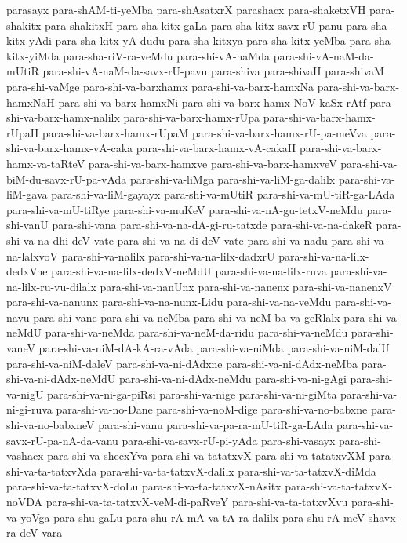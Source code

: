 {parasayx
para-shAM-ti-yeMba
para-shAsatxrX
parashacx
para-shaketxVH
para-shakitx
para-shakitxH
para-sha-kitx-gaLa
para-sha-kitx-savx-rU-panu
para-sha-kitx-yAdi
para-sha-kitx-yA-dudu
para-sha-kitxya
para-sha-kitx-yeMba
para-sha-kitx-yiMda
para-sha-riV-ra-veMdu
para-shi-vA-naMda
para-shi-vA-naM-da-mUtiR
para-shi-vA-naM-da-savx-rU-pavu
para-shiva
para-shivaH
para-shivaM
para-shi-vaMge
para-shi-va-barxhamx
para-shi-va-barx-hamxNa
para-shi-va-barx-hamxNaH
para-shi-va-barx-hamxNi
para-shi-va-barx-hamx-NoV-kaSx-rAtf
para-shi-va-barx-hamx-nalilx
para-shi-va-barx-hamx-rUpa
para-shi-va-barx-hamx-rUpaH
para-shi-va-barx-hamx-rUpaM
para-shi-va-barx-hamx-rU-pa-meVva
para-shi-va-barx-hamx-vA-caka
para-shi-va-barx-hamx-vA-cakaH
para-shi-va-barx-hamx-va-taRteV
para-shi-va-barx-hamxve
para-shi-va-barx-hamxveV
para-shi-va-biM-du-savx-rU-pa-vAda
para-shi-va-liMga
para-shi-va-liM-ga-dalilx
para-shi-va-liM-gava
para-shi-va-liM-gayayx
para-shi-va-mUtiR
para-shi-va-mU-tiR-ga-LAda
para-shi-va-mU-tiRye
para-shi-va-muKeV
para-shi-va-nA-gu-tetxV-neMdu
para-shi-vanU
para-shi-vana
para-shi-va-na-dA-gi-ru-tatxde
para-shi-va-na-dakeR
para-shi-va-na-dhi-deV-vate
para-shi-va-na-di-deV-vate
para-shi-va-nadu
para-shi-va-na-lalxvoV
para-shi-va-nalilx
para-shi-va-na-lilx-dadxrU
para-shi-va-na-lilx-dedxVne
para-shi-va-na-lilx-dedxV-neMdU
para-shi-va-na-lilx-ruva
para-shi-va-na-lilx-ru-vu-dilalx
para-shi-va-nanUnx
para-shi-va-nanenx
para-shi-va-nanenxV
para-shi-va-nanunx
para-shi-va-na-nunx-Lidu
para-shi-va-na-veMdu
para-shi-va-navu
para-shi-vane
para-shi-va-neMba
para-shi-va-neM-ba-va-geRlalx
para-shi-va-neMdU
para-shi-va-neMda
para-shi-va-neM-da-ridu
para-shi-va-neMdu
para-shi-vaneV
para-shi-va-niM-dA-kA-ra-vAda
para-shi-va-niMda
para-shi-va-niM-dalU
para-shi-va-niM-daleV
para-shi-va-ni-dAdxne
para-shi-va-ni-dAdx-neMba
para-shi-va-ni-dAdx-neMdU
para-shi-va-ni-dAdx-neMdu
para-shi-va-ni-gAgi
para-shi-va-nigU
para-shi-va-ni-ga-piRsi
para-shi-va-nige
para-shi-va-ni-giMta
para-shi-va-ni-gi-ruva
para-shi-va-no-Dane
para-shi-va-noM-dige
para-shi-va-no-babxne
para-shi-va-no-babxneV
para-shi-vanu
para-shi-va-pa-ra-mU-tiR-ga-LAda
para-shi-va-savx-rU-pa-nA-da-vanu
para-shi-va-savx-rU-pi-yAda
para-shi-vasayx
para-shi-vashacx
para-shi-va-shecxYva
para-shi-va-tatatxvX
para-shi-va-tatatxvXM
para-shi-va-ta-tatxvXda
para-shi-va-ta-tatxvX-dalilx
para-shi-va-ta-tatxvX-diMda
para-shi-va-ta-tatxvX-doLu
para-shi-va-ta-tatxvX-nAsitx
para-shi-va-ta-tatxvX-noVDA
para-shi-va-ta-tatxvX-veM-di-paRveY
para-shi-va-ta-tatxvXvu
para-shi-va-yoVga
para-shu-gaLu
para-shu-rA-mA-va-tA-ra-dalilx
para-shu-rA-meV-shavx-ra-deV-vara
}
